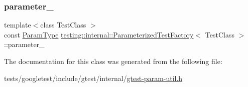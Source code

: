 \subsubsection{\texorpdfstring{parameter\+\_\+}{parameter\_}}
{\footnotesize\ttfamily template$<$class Test\+Class $>$ \\
const \hyperlink{classtesting_1_1internal_1_1ParameterizedTestFactory_ad9a27b8e1a83de2f1687625bccff460d}{Param\+Type} \hyperlink{classtesting_1_1internal_1_1ParameterizedTestFactory}{testing\+::internal\+::\+Parameterized\+Test\+Factory}$<$ Test\+Class $>$\+::parameter\+\_\+\hspace{0.3cm}{\ttfamily [private]}}



The documentation for this class was generated from the following file\+:\begin{DoxyCompactItemize}
\item 
tests/googletest/include/gtest/internal/\hyperlink{gtest-param-util_8h}{gtest-\/param-\/util.\+h}\end{DoxyCompactItemize}
